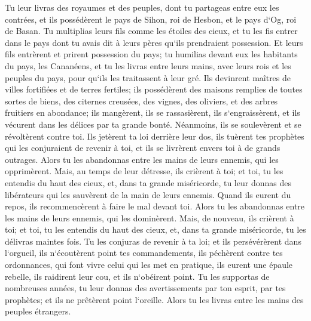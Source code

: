 \verse Tu leur livras des royaumes et des peuples, dont tu partageas entre eux les contrées, et ils possédèrent le pays de Sihon, roi de Hesbon, et le pays d`Og, roi de Basan. 
\verse Tu multiplias leurs fils comme les étoiles des cieux, et tu les fis entrer dans le pays dont tu avais dit à leurs pères qu`ils prendraient possession. 
\verse Et leurs fils entrèrent et prirent possession du pays; tu humilias devant eux les habitants du pays, les Cananéens, et tu les livras entre leurs mains, avec leurs rois et les peuples du pays, pour qu`ils les traitassent à leur gré. 
\verse Ils devinrent maîtres de villes fortifiées et de terres fertiles; ils possédèrent des maisons remplies de toutes sortes de biens, des citernes creusées, des vignes, des oliviers, et des arbres fruitiers en abondance; ils mangèrent, ils se rassasièrent, ils s`engraissèrent, et ils vécurent dans les délices par ta grande bonté. 
\verse Néanmoins, ils se soulevèrent et se révoltèrent contre toi. Ils jetèrent ta loi derrière leur dos, ils tuèrent tes prophètes qui les conjuraient de revenir à toi, et ils se livrèrent envers toi à de grands outrages. 
\verse Alors tu les abandonnas entre les mains de leurs ennemis, qui les opprimèrent. Mais, au temps de leur détresse, ils crièrent à toi; et toi, tu les entendis du haut des cieux, et, dans ta grande miséricorde, tu leur donnas des libérateurs qui les sauvèrent de la main de leurs ennemis. 
\verse Quand ils eurent du repos, ils recommencèrent à faire le mal devant toi. Alors tu les abandonnas entre les mains de leurs ennemis, qui les dominèrent. Mais, de nouveau, ils crièrent à toi; et toi, tu les entendis du haut des cieux, et, dans ta grande miséricorde, tu les délivras maintes fois. 
\verse Tu les conjuras de revenir à ta loi; et ils persévérèrent dans l`orgueil, ils n`écoutèrent point tes commandements, ils péchèrent contre tes ordonnances, qui font vivre celui qui les met en pratique, ils eurent une épaule rebelle, ils raidirent leur cou, et ils n`obéirent point. 
\verse Tu les supportas de nombreuses années, tu leur donnas des avertissements par ton esprit, par tes prophètes; et ils ne prêtèrent point l`oreille. Alors tu les livras entre les mains des peuples étrangers. 
